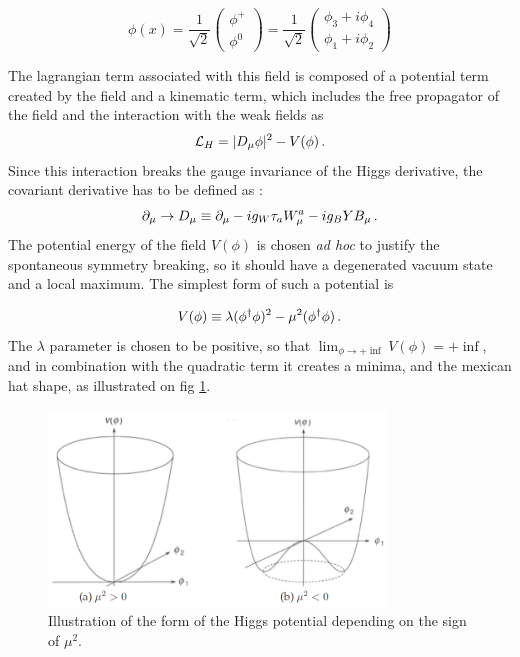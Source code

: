 \begin{equation}
    \phi(x) = \frac{1}{\sqrt{2}} \begin{pmatrix} \phi^+ \\ \phi^0 \end{pmatrix} = \frac{1}{\sqrt{2}} \begin{pmatrix} \phi_3 + i \phi_4 \\ \phi_1 + i \phi_2 \end{pmatrix}
\end{equation}

The lagrangian term associated with this field is composed of a potential term created by the field and a kinematic term, which includes the free propagator of the field and the interaction with the weak fields as 
\begin{equation}
    \Lagr_H = | D_{\mu}\phi |^2 - V(\phi) \mend
    \label{eq:higgs_lagr}
\end{equation}
Since this interaction breaks the gauge invariance of the Higgs derivative, the covariant derivative has to be defined as :
\begin{equation}
    \partial_{\mu} \rightarrow D_{\mu} \equiv \partial_{\mu} -ig_W \tau_a W_{\mu}^a - ig_B Y B_{\mu} \mend
\end{equation}
The potential energy of the field $V(\phi)$ is chosen \textit{ad hoc} to justify the spontaneous symmetry breaking, so it should have a degenerated vacuum state and a local maximum. The simplest form of such a potential is

\begin{equation}
    V(\phi) \equiv \lambda(\phi^{\dagger}\phi)^2 - \mu^2 (\phi^{\dagger}\phi) \mend
\end{equation}
The $\lambda$ parameter is chosen to be positive, so that $\lim_{\phi \to + \inf} V(\phi) = + \inf$, and in combination with the quadratic term it creates a minima, and the mexican hat shape, as illustrated on fig \ref{fig:mexicanhat}.

\begin{figure}
    \centering
    \includegraphics[width=0.8\textwidth]{Images/higgs_potential.png}
    \caption{Illustration of the form of the Higgs potential depending on the sign of $\mu^2$.}
    \label{fig:mexicanhat}
\end{figure}

